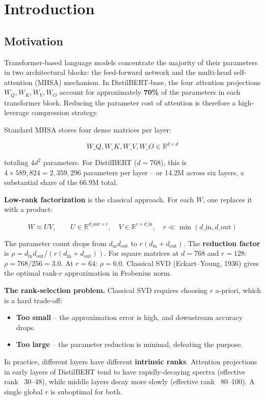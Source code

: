 
\section{Introduction}

\subsection{Motivation}

Transformer-based language models concentrate the majority of their parameters 
in two architectural blocks: the feed-forward network and the multi-head 
self-attention (MHSA) mechanism. In DistilBERT-base, the four attention 
projections $W_Q, W_K, W_V, W_O$ account for approximately \textbf{70\%} of the 
parameters in each transformer block. Reducing the parameter cost of attention 
is therefore a high-leverage compression strategy.

Standard MHSA stores four dense matrices per layer:

\[
W\_Q, W\_K, W\_V, W\_O \in \mathbb{R}^{d \times d}
\tag{1.1}
\]

totaling $4d^2$ parameters. For DistilBERT ($d = 768$), this is $4 \times 589{,}824 = 2{,}359{,}296$ 
parameters per layer -- or 14.2M across six layers, a substantial share of the 
66.9M total.

\textbf{Low-rank factorization} is the classical approach. For each $W$, one 
replaces it with a product:

\[
W \approx U V, \qquad
U \in \mathbb{R}^{d\_\text{out} \times r}, \quad
V \in \mathbb{R}^{r \times d\_\text{in}}, \quad r \ll \min(d\_\text{in}, d\_\text{out})
\tag{1.2}
\]

The parameter count drops from $d_\text{in} d_\text{out}$ to 
$r(d_\text{in} + d_\text{out})$. The \textbf{reduction factor} is 
$\rho = d_\text{in} d_\text{out} / (r(d_\text{in} + d_\text{out}))$. For square 
matrices at $d = 768$ and $r = 128$: $\rho = 768 / 256 = 3.0$. At $r = 64$: 
$\rho = 6.0$. Classical SVD (Eckart--Young, 1936) gives the optimal rank-$r$ 
approximation in Frobenius norm.

\textbf{The rank-selection problem.} Classical SVD requires choosing $r$ 
a-priori, which is a hard trade-off:

\begin{itemize}
\item \textbf{Too small} -- the approximation error is high, and downstream accuracy
  drops.
\item \textbf{Too large} -- the parameter reduction is minimal, defeating the purpose.

\end{itemize}
In practice, different layers have different \textbf{intrinsic ranks}. Attention 
projections in early layers of DistilBERT tend to have rapidly-decaying 
spectra (effective rank ~30--48), while middle layers decay more slowly 
(effective rank ~80--100). A single global $r$ is suboptimal for both.

